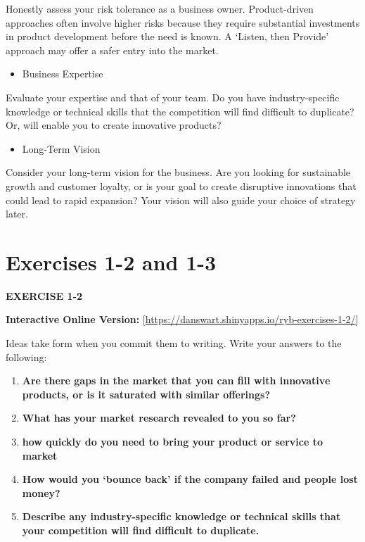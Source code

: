 \documentclass[
]{book}
\providecommand{\tightlist}{%
  \setlength{\itemsep}{0pt}\setlength{\parskip}{0pt}}
\begin{document}
Honestly assess your risk tolerance as a business owner. Product-driven approaches often involve higher risks because they require substantial investments in product development before the need is known. A {`Listen, then Provide'} approach may offer a safer entry into the market.

\begin{itemize}
\tightlist
\item
  Business Expertise
\end{itemize}

Evaluate your expertise and that of your team. Do you have industry-specific knowledge or technical skills that the competition will find difficult to duplicate? Or, will enable you to create innovative products?

\begin{itemize}
\tightlist
\item
  Long-Term Vision
\end{itemize}

Consider your long-term vision for the business. Are you looking for sustainable growth and customer loyalty, or is your goal to create disruptive innovations that could lead to rapid expansion? Your vision will also guide your choice of strategy later.

\hypertarget{exercises-1-2-and-1-3}{%
\section{Exercises 1-2 and 1-3}\label{exercises-1-2-and-1-3}}

\textbf{EXERCISE 1-2}

{\textbf{Interactive Online Version:}} {[}\url{https://danswart.shinyapps.io/ryb-exercises-1-2/}{]}

Ideas take form when you commit them to writing. Write your answers to the following:

\begin{enumerate}
\def\labelenumi{\arabic{enumi}.}
\item
  \textbf{Are there gaps in the market that you can fill with innovative products, or is it saturated with similar offerings?}
\item
  \textbf{What has your market research revealed to you so far?}
\item
  \textbf{how quickly do you need to bring your product or service to market}
\item
  \textbf{How would you `bounce back' if the company failed and people lost money?}
\item
  \textbf{Describe any industry-specific knowledge or technical skills that your competition will find difficult to duplicate.}
\end{enumerate}
\end{document}
